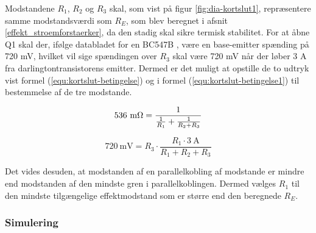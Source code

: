 Modstandene $R_1$, $R_2$ og $R_3$ skal, som vist på figur \ref{fig:dia-kortslut1}, repræsentere samme modstandsværdi som $R_E$, som blev beregnet i afsnit \ref{effekt_stroemforstaerker}, da den stadig skal sikre termisk stabilitet. For at åbne Q1 skal der, ifølge databladet for en BC547B , være en base-emitter spænding på 720 mV, hvilket vil sige spændingen over $R_3$ skal være 720 mV når der løber 3 A fra darlingtontransistorens emitter. Dermed er det muligt at opstille de to udtryk vist formel (\ref{equ:kortslut-betingelse}) og i formel (\ref{equ:kortslut-betingelse1}) til bestemmelse af de tre modstande.

\begin{equation}
\label{equ:kortslut-betingelse}
\mathrm{536~m\ohm} = \frac{1}{\frac{1}{R_1}+\frac{1}{R_2 + R_3}}
\end{equation}

\begin{equation}
\label{equ:kortslut-betingelse1}
\mathrm{720~mV} = R_3 \cdot \frac{R_1 \cdot \mathrm{3~A}}{R_ 1+ R_2 + R_3}
\end{equation}

Det vides desuden, at modstanden af en parallelkobling af modstande er mindre end modstanden af den mindste gren i parallelkoblingen. Dermed vælges $R_1$ til den mindste tilgængelige effektmodstand som er større end den beregnede $R_E$. 

\subsubsection*{Simulering}